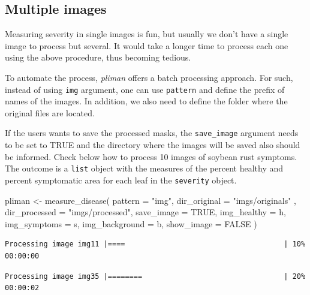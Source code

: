 \documentclass[
  letterpaper,
  DIV=11,
  numbers=noendperiod]{scrreprt}
\newenvironment{Shaded}{\begin{snugshade}}{\end{snugshade}}
\newcommand{\AttributeTok}[1]{\textcolor[rgb]{0.40,0.45,0.13}{#1}}
\newcommand{\ConstantTok}[1]{\textcolor[rgb]{0.56,0.35,0.01}{#1}}
\newcommand{\FunctionTok}[1]{\textcolor[rgb]{0.28,0.35,0.67}{#1}}
\newcommand{\NormalTok}[1]{\textcolor[rgb]{0.00,0.23,0.31}{#1}}
\newcommand{\OtherTok}[1]{\textcolor[rgb]{0.00,0.23,0.31}{#1}}
\newcommand{\StringTok}[1]{\textcolor[rgb]{0.13,0.47,0.30}{#1}}
\begin{document}
\hypertarget{multiple-images}{%
\subsection{Multiple images}\label{multiple-images}}

Measuring severity in single images is fun, but usually we don't have a
single image to process but several. It would take a longer time to
process each one using the above procedure, thus becoming tedious.

To automate the process, \emph{pliman} offers a batch processing
approach. For such, instead of using \texttt{img} argument, one can use
\texttt{pattern} and define the prefix of names of the images. In
addition, we also need to define the folder where the original files are
located.

If the users wants to save the processed masks, the \texttt{save\_image}
argument needs to be set to TRUE and the directory where the images will
be saved also should be informed. Check below how to process 10 images
of soybean rust symptoms. The outcome is a \texttt{list} object with the
measures of the percent healthy and percent symptomatic area for each
leaf in the \texttt{severity} object.

\begin{Shaded}
\begin{Highlighting}[]
\NormalTok{pliman }\OtherTok{\textless{}{-}} \FunctionTok{measure\_disease}\NormalTok{(}
  \AttributeTok{pattern =} \StringTok{"img"}\NormalTok{,}
  \AttributeTok{dir\_original =} \StringTok{"imgs/originals"}\NormalTok{ ,}
  \AttributeTok{dir\_processed =} \StringTok{"imgs/processed"}\NormalTok{,}
  \AttributeTok{save\_image =} \ConstantTok{TRUE}\NormalTok{,}
  \AttributeTok{img\_healthy =}\NormalTok{ h,}
  \AttributeTok{img\_symptoms =}\NormalTok{ s,}
  \AttributeTok{img\_background =}\NormalTok{ b,}
  \AttributeTok{show\_image =} \ConstantTok{FALSE}
\NormalTok{)}
\end{Highlighting}
\end{Shaded}

\begin{verbatim}
Processing image img11 |====                                     | 10% 00:00:00 
\end{verbatim}

\begin{verbatim}
Processing image img35 |========                                 | 20% 00:00:02 
\end{verbatim}
\end{document}
